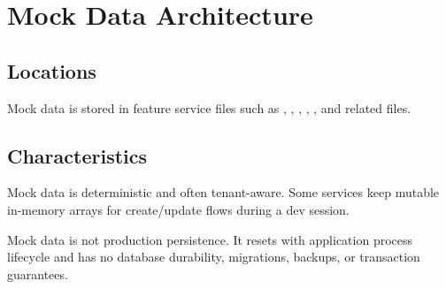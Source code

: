 \chapter{Mock Data Architecture}
\section{Locations}
Mock data is stored in feature service files such as , , , , , and related files.

\section{Characteristics}
Mock data is deterministic and often tenant-aware. Some services keep mutable in-memory arrays for create/update flows during a dev session.

\begin{warningbox}
Mock data is not production persistence. It resets with application process lifecycle and has no database durability, migrations, backups, or transaction guarantees.
\end{warningbox}
